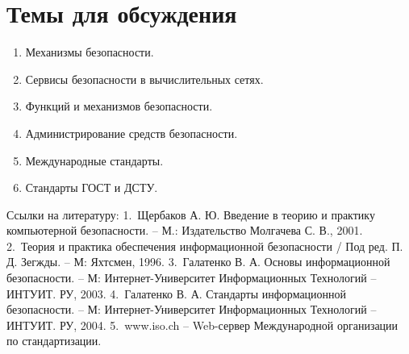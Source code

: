 \section{Темы для обсуждения}\label{sect4_b}
\begin{enumerate}
  \item Механизмы безопасности.
  \item Сервисы безопасности в вычислительных сетях.
  \item Функций и механизмов безопасности.
  \item Администрирование средств безопасности.
  \item Международные стандарты.
  \item Стандарты ГОСТ и ДСТУ.
\end{enumerate}

Ссылки на литературу:
1.~Щербаков А. Ю. Введение в теорию и практику компьютерной безопасности. – М.: Издательство Молгачева С. В., 2001.%
2.~Теория и практика обеспечения информационной безопасности / Под ред. П. Д. Зегжды. – М: Яхтсмен, 1996.%
3.~Галатенко В. А. Основы информационной безопасности. – М: Интернет-Университет Информационных Технологий – ИНТУИТ. РУ, 2003.%
4.~Галатенко В. А. Стандарты информационной безопасности. – М: Интернет-Университет Информационных Технологий – ИНТУИТ. РУ, 2004.%
5.~www.iso.ch – Web-сервер Международной организации по стандартизации.%
